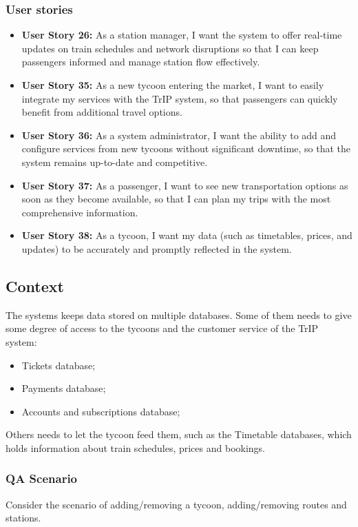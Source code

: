 \subsubsection*{User stories}
\begin{itemize}
    \item \textbf{User Story 26:} As a station manager, I want the system to offer real-time updates on train schedules and network disruptions so that I can keep passengers informed and manage station flow effectively. 
    \item \textbf{User Story 35:} As a new tycoon entering the market, I want to easily integrate my services with the TrIP system, so that passengers can quickly benefit from additional travel options.
    \item \textbf{User Story 36:} As a system administrator, I want the ability to add and configure services from new tycoons without significant downtime, so that the system remains up-to-date and competitive. 
    \item \textbf{User Story 37:} As a passenger, I want to see new transportation options as soon as they become available, so that I can plan my trips with the most comprehensive information.
    \item \textbf{User Story 38:} As a tycoon, I want my data (such as timetables, prices, and updates) to be accurately and promptly reflected in the system.
\end{itemize}

\subsection*{Context}
The systems keeps data stored on multiple databases. 
Some of them needs to give some degree of access to the tycoons and the customer service of the TrIP system:
\begin{itemize}
    \item Tickets database;
    \item Payments database;
    \item Accounts and subscriptions database;
\end{itemize}

Others needs to let the tycoon feed them, such as the Timetable databases, which holds information about train schedules,
prices and bookings.

\subsubsection*{QA Scenario} %
Consider the scenario of adding/removing a tycoon, adding/removing routes and stations.
